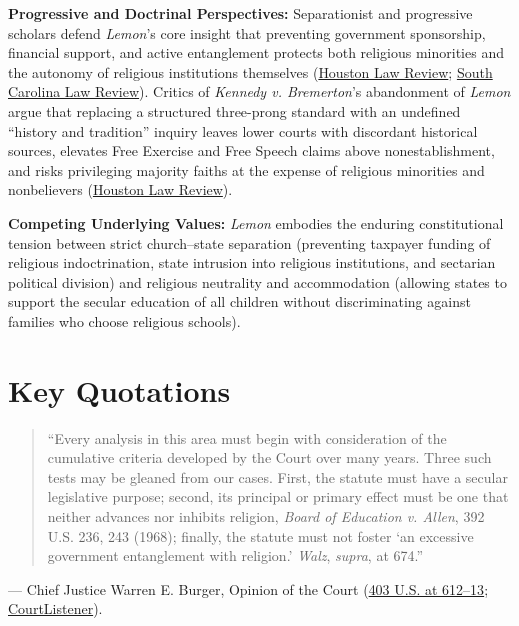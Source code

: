 \documentclass[12pt]{article}
\begin{document}
\textbf{Progressive and Doctrinal Perspectives:} Separationist and progressive scholars defend \textit{Lemon}'s core insight that preventing government sponsorship, financial support, and active entanglement protects both religious minorities and the autonomy of religious institutions themselves (\href{https://houstonlawreview.org/article/92811-unprincipled}{Houston Law Review}; \href{https://sclawreview.org/article/establishment-clause-jurisprudence-and-the-constitutional-limits-on-religion-in-public-schools/}{South Carolina Law Review}). Critics of \textit{Kennedy v. Bremerton}'s abandonment of \textit{Lemon} argue that replacing a structured three-prong standard with an undefined ``history and tradition'' inquiry leaves lower courts with discordant historical sources, elevates Free Exercise and Free Speech claims above nonestablishment, and risks privileging majority faiths at the expense of religious minorities and nonbelievers (\href{https://houstonlawreview.org/article/92811-unprincipled}{Houston Law Review}).

\textbf{Competing Underlying Values:} \textit{Lemon} embodies the enduring constitutional tension between strict church--state separation (preventing taxpayer funding of religious indoctrination, state intrusion into religious institutions, and sectarian political division) and religious neutrality and accommodation (allowing states to support the secular education of all children without discriminating against families who choose religious schools).

\section{Key Quotations}
\begin{quote}
``Every analysis in this area must begin with consideration of the cumulative criteria developed by the Court over many years. Three such tests may be gleaned from our cases. First, the statute must have a secular legislative purpose; second, its principal or primary effect must be one that neither advances nor inhibits religion, \textit{Board of Education v. Allen}, 392 U.S. 236, 243 (1968); finally, the statute must not foster `an excessive government entanglement with religion.' \textit{Walz}, \textit{supra}, at 674.''
\end{quote}
\noindent --- Chief Justice Warren E. Burger, Opinion of the Court (\href{https://supreme.justia.com/cases/federal/us/403/602/}{403 U.S. at 612--13}; \href{https://www.courtlistener.com/opinion/108380/lemon-v-kurtzman/}{CourtListener}).
\end{document}
